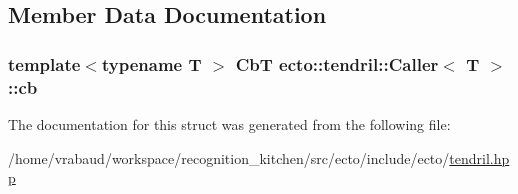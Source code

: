 \subsection{Member Data Documentation}
\hypertarget{structecto_1_1tendril_1_1Caller_afecdbc09ca504c16292a6365ab1cd950}{}
\subsubsection[{cb}]{\setlength{\rightskip}{0pt plus 5cm}template$<$typename T $>$ {\bf Cb\+T} {\bf ecto\+::tendril\+::\+Caller}$<$ T $>$\+::cb}\label{structecto_1_1tendril_1_1Caller_afecdbc09ca504c16292a6365ab1cd950}


The documentation for this struct was generated from the following file\+:\begin{DoxyCompactItemize}
\item 
/home/vrabaud/workspace/recognition\+\_\+kitchen/src/ecto/include/ecto/\hyperlink{tendril_8hpp}{tendril.\+hpp}\end{DoxyCompactItemize}

